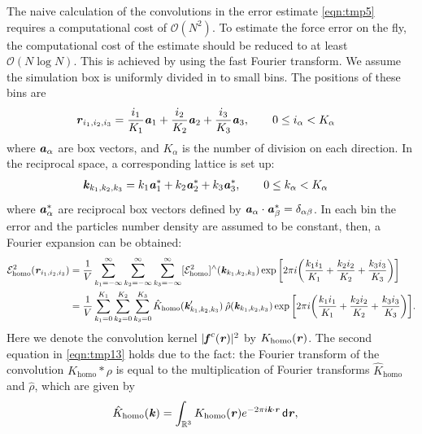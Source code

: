 \documentclass[aps,pre,preprint]{revtex4-1}
\renewcommand{\v}[1]{\textbf{\textit{#1}}}
\renewcommand{\d}[1]{\textsf{#1}}
\begin{document}
The naive calculation of the convolutions in the error estimate \eqref{eqn:tmp5} requires
a computational cost of $\mathcal O(N^2)$. To estimate the force error
on the fly, the computational cost of the estimate should be reduced to
at least $\mathcal O(N\log N)$.  This is achieved by  using the fast Fourier transform. We
assume the simulation box is uniformly divided in to small bins.  The
positions of these bins are
\begin{align}
  \v r_{i_1, i_2, i_3} & =
  \frac{i_1}{K_1}\v a_1 + 
  \frac{i_2}{K_2}\v a_2 + 
  \frac{i_3}{K_3}\v a_3,\qquad 0\leq i_\alpha< K_\alpha
\end{align}
where $\v a_\alpha$ are box vectors, and $K_\alpha$ is the number of
division on each direction. In the reciprocal space, a corresponding
lattice is set up:
\begin{align}
  \v k_{k_1, k_2, k_3} & =
  k_1\v a_1^\ast +
  k_2\v a_2^\ast +
  k_3\v a_3^\ast, \qquad 0\leq k_\alpha<K_\alpha
\end{align}
where $\v a_\alpha^\ast$ are reciprocal box vectors defined by $\v
a_\alpha\cdot\v a_\beta^\ast = \delta_{\alpha\beta}$.  In each bin the
error and the particles number density are assumed to be constant,
then, a Fourier expansion can be obtained:
\begin{align}\nonumber
  \mathcal E^2_{\textrm{homo}}(\v r_{i_1,i_2,i_3})
  & =
  \frac1V\sum_{k_1=-\infty}^\infty\sum_{k_2=-\infty}^\infty\sum_{k_3=-\infty}^\infty
  [{\mathcal E}^2_{\textrm{homo}}]^{\wedge}(\v k_{k_1,k_2,k_3})
  \exp\bigg[
  2\pi i\bigg(
  \frac{k_1i_1}{K_1} + \frac{k_2i_2}{K_2} + \frac{k_3i_3}{K_3}
  \bigg)
  \bigg] \\\label{eqn:tmp13}
  & =
  \frac1V\sum_{k_1=0}^{K_1}\sum_{k_2=0}^{K_2}\sum_{k_3=0}^{K_3}
  \hat{K}_{\textrm{homo}}(\v k'_{k_1,k_2,k_3})\:
  \hat{\rho}(\v k_{k_1,k_2,k_3})
  \exp\bigg[
  2\pi i\bigg(
  \frac{k_1i_1}{K_1} + \frac{k_2i_2}{K_2} + \frac{k_3i_3}{K_3}
  \bigg)
  \bigg].
\end{align}
Here we denote the convolution kernel $\vert\v f^c(\v r)\vert^2$ by
$K_{\textrm{homo}}(\v r)$.  The second equation in \eqref{eqn:tmp13}
holds due to the fact: the Fourier transform of the convolution
$K_{\textrm{homo}}\ast\rho$ is equal to the multiplication of Fourier transforms
$\hat{K}_{\textrm{homo}}$ and $\hat\rho$, which are given by
\begin{align}\label{eqn:f-kernel-homo}
  \hat K_{\textrm{homo}}(\v k)
  &=
  \int_{\mathbb R^3}K_{\textrm{homo}}(\v r)e^{-2\pi i\v k\cdot\v r}\,\d d\v r,
\end{align}
\end{document}
